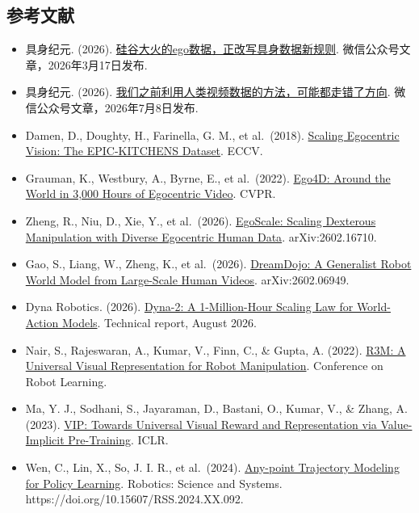 \FloatBarrier
{}
\hypertarget{ux53c2ux8003ux6587ux732e-164}{%
\subsection{参考文献}\label{ux53c2ux8003ux6587ux732e-164}}

\vspace{0.25em}
\begin{itemize}
\tightlist
\item
  具身纪元. (2026). \href{https://www.jintiankansha.com/t/rxSAsq869K}{硅谷大火的ego数据，正改写具身数据新规则}. 微信公众号文章，2026年3月17日发布.
\item
  具身纪元. (2026). \href{https://www.jintiankansha.com/t/PtzdfzjSA4}{我们之前利用人类视频数据的方法，可能都走错了方向}. 微信公众号文章，2026年7月8日发布.
\item
  Damen, D., Doughty, H., Farinella, G. M., et al.~(2018). \href{https://arxiv.org/abs/1804.02748}{Scaling Egocentric Vision: The EPIC-KITCHENS Dataset}. ECCV.
\item
  Grauman, K., Westbury, A., Byrne, E., et al.~(2022). \href{https://arxiv.org/abs/2110.07058}{Ego4D: Around the World in 3,000 Hours of Egocentric Video}. CVPR.
\item
  Zheng, R., Niu, D., Xie, Y., et al.~(2026). \href{https://arxiv.org/abs/2602.16710}{EgoScale: Scaling Dexterous Manipulation with Diverse Egocentric Human Data}. arXiv:2602.16710.
\item
  Gao, S., Liang, W., Zheng, K., et al.~(2026). \href{https://arxiv.org/abs/2602.06949}{DreamDojo: A Generalist Robot World Model from Large-Scale Human Videos}. arXiv:2602.06949.
\item
  Dyna Robotics. (2026). \href{https://www.dyna.co/dyna-2}{Dyna-2: A 1-Million-Hour Scaling Law for World-Action Models}. Technical report, August 2026.
\item
  Nair, S., Rajeswaran, A., Kumar, V., Finn, C., \& Gupta, A. (2022). \href{https://arxiv.org/abs/2203.12601}{R3M: A Universal Visual Representation for Robot Manipulation}. Conference on Robot Learning.
\item
  Ma, Y. J., Sodhani, S., Jayaraman, D., Bastani, O., Kumar, V., \& Zhang, A. (2023). \href{https://arxiv.org/abs/2210.00030}{VIP: Towards Universal Visual Reward and Representation via Value-Implicit Pre-Training}. ICLR.
\item
  Wen, C., Lin, X., So, J. I. R., et al.~(2024). \href{https://www.roboticsproceedings.org/rss20/p092.html}{Any-point Trajectory Modeling for Policy Learning}. Robotics: Science and Systems. https://doi.org/10.15607/RSS.2024.XX.092.

\end{itemize}

